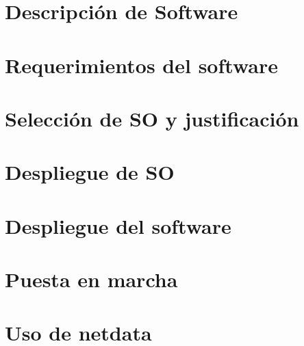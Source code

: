 \documentclass[a4paper, 11pt]{report} %
\begin{document}
 




\tableofcontents%

\chapter{Descripción de Software}


\chapter{Requerimientos del software}


\chapter{Selección de SO y justificación}


\chapter{Despliegue de SO}


\chapter{Despliegue del software}


\chapter{Puesta en marcha}


\chapter{Uso de netdata}

\printbibliography
\end{document}
